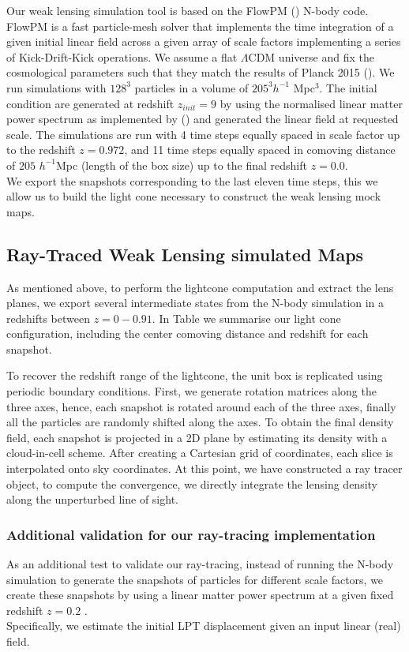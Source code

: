\documentclass[twocolumn,twocolappendix]{aastex63}
\begin{document}
Our weak lensing simulation tool is based on the FlowPM (\cite{modi2021flowpm}) N-body code.
FlowPM is a fast particle-mesh solver that implements the time integration of a given initial linear field  across a given array of scale factors implementing a series of Kick-Drift-Kick operations. We assume a flat $\Lambda$CDM universe and fix the cosmological parameters such that they match the results of Planck 2015 (\cite{ade2016planck}). We run simulations with $128^3$ particles in a volume of $205^3 h^{-1}$ Mpc$^3$.
The initial condition are generated at redshift $z_{init}=9$ by using the normalised linear matter power spectrum as implemented by (\cite{eisenstein1998baryonic}) and generated the linear field at requested scale.
The simulations are run with 4 time steps equally spaced in scale factor up to the redshift $z=0.972$, and 11 time steps equally spaced in comoving distance of $205$ $h^{-1}$Mpc (length of the box size) up to the final redshift $z=0.0$.  \\
We export the snapshots corresponding to the last eleven time steps, this we allow us to build the light cone necessary to construct the weak lensing mock maps.


\subsection{Ray-Traced Weak Lensing simulated Maps}
As mentioned above, to perform the lightcone computation and extract the lens planes, we export several intermediate states from the N-body simulation in a redshifts between $z= 0-0.91$. 
In Table we summarise our light cone configuration, including the center comoving distance and redshift for each snapshot.

To recover the redshift range of the lightcone, the unit box is replicated using periodic boundary conditions. First, we generate rotation matrices along the three axes, hence, each snapshot is rotated around each of the three axes, finally all the particles are randomly shifted along the axes. 
To obtain the final density field, each snapshot is projected in a 2D plane by estimating its density with a cloud-in-cell scheme. 
After creating a Cartesian grid of coordinates, each slice is interpolated onto sky coordinates.
 At this point, we have constructed a ray tracer object, to compute the convergence, we directly integrate the lensing density along the unperturbed line of sight. 

    
\subsubsection{Additional validation for our ray-tracing implementation } 
As an additional test to validate our ray-tracing, instead of running the N-body simulation to generate the snapshots of particles for different scale factors, we create these snapshots by using a linear matter power spectrum at a given fixed redshift $z=0.2$ . \\
Specifically, we estimate the initial LPT displacement given an input linear (real) field.
\end{document}
